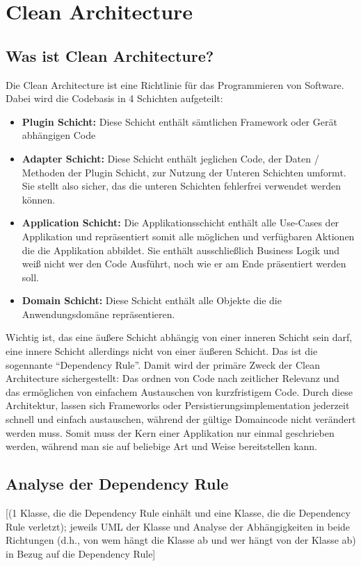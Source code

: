 \chapter{Clean Architecture}

\section{Was ist Clean Architecture?}
Die Clean Architecture ist eine Richtlinie für das Programmieren von Software. Dabei wird die Codebasis in 4 Schichten aufgeteilt:
\begin{itemize}
	\item \textbf{Plugin Schicht:} Diese Schicht enthält sämtlichen Framework oder Gerät abhängigen Code
	\item \textbf{Adapter Schicht:} Diese Schicht enthält jeglichen Code, der Daten / Methoden der Plugin Schicht, zur Nutzung der Unteren Schichten umformt. Sie stellt also sicher, das die unteren Schichten fehlerfrei verwendet werden können.
	\item \textbf{Application Schicht:} Die Applikationsschicht enthält alle Use-Cases der Applikation und repräsentiert somit alle möglichen und verfügbaren Aktionen die die Applikation abbildet. Sie enthält ausschließlich Business Logik und weiß nicht wer den Code Ausführt, noch wie er am Ende präsentiert werden soll.
	\item \textbf{Domain Schicht:} Diese Schicht enthält alle Objekte die die Anwendungsdomäne repräsentieren.
\end{itemize}
Wichtig ist, das eine äußere Schicht abhängig von einer inneren Schicht sein darf, eine innere Schicht allerdings nicht von einer äußeren Schicht. Das ist die sogennante \enquote{Dependency Rule}. Damit wird der primäre Zweck der Clean Architecture sichergestellt: Das ordnen von Code nach zeitlicher Relevanz und das ermöglichen von einfachem Austauschen von kurzfristigem Code. Durch diese Architektur, lassen sich Frameworks oder Persistierungsimplementation jederzeit schnell und einfach austauschen, während der gültige Domaincode nicht verändert werden muss. Somit muss der Kern einer Applikation nur einmal geschrieben werden, während man sie auf beliebige Art und Weise bereitstellen kann.

\section{Analyse der Dependency Rule}
[(1 Klasse, die die Dependency Rule einhält und eine Klasse, die die Dependency Rule verletzt);   jeweils UML der Klasse und Analyse der Abhängigkeiten in beide Richtungen (d.h., von wem hängt die Klasse ab und wer hängt von der Klasse ab) in Bezug auf die Dependency Rule]


